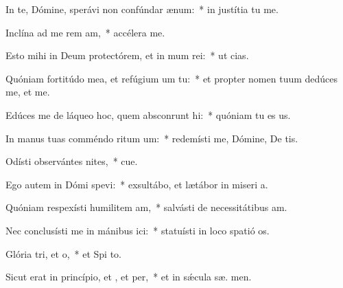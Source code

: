 \item In te, Dómine, sperávi non confúndar  ænum:~* in justítia tu  me.
\item Inclína ad me rem am,~* accélera   me.
\item Esto mihi in Deum protectórem, et in mum rei:~* ut   cias.
\item Quóniam fortitúdo mea, et refúgium um  tu:~* et propter nomen tuum dedúces me, et  me.
\item Edúces me de láqueo hoc, quem absconrunt hi:~* quóniam tu es  us.
\item In manus tuas comméndo ritum um:~* redemísti me, Dómine, De tis.
\item Odísti observántes nites,~* cue.
\item Ego autem in Dómi spevi:~* exsultábo, et lætábor in miseri a.
\item Quóniam respexísti humilitem am,~* salvásti de necessitátibus  am.
\item Nec conclusísti me in mánibus ici:~* statuísti in loco spatió  os.
\item Glória tri, et o,~* et Spi to.
\item Sicut erat in princípio, et , et per,~* et in sǽcula sæ. men.
